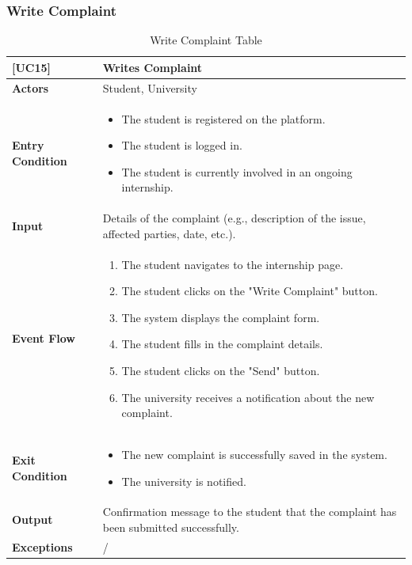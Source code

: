 \subsubsection*{Write Complaint}
\begin{table}[H]
    \centering
    \renewcommand{\arraystretch}{1.5}
    \begin{tabular}{|p{4cm}|p{11cm}|}
    \hline
    \rowcolor{bluepoli!40}
    \textbf{[UC15]} & \textbf{Writes Complaint} \\ \hline \hline
    \textbf{Actors} & Student, University \\ \hline
    \textbf{Entry Condition} & 
    {\setlength{\leftmargini}{1.1em}
    \begin{itemize}
        \item The student is registered on the platform.
        \item The student is logged in.
        \item The student is currently involved in an ongoing internship.
    \end{itemize}} \\ \hline
    \textbf{Input} & Details of the complaint (e.g., description of the issue, affected parties, date, etc.). \\ \hline
    \textbf{Event Flow} & 
    {\setlength{\leftmargini}{1.4em}
    \begin{enumerate}
        \item The student navigates to the internship page.
        \item The student clicks on the "Write Complaint" button.
        \item The system displays the complaint form.
        \item The student fills in the complaint details.
        \item The student clicks on the "Send" button.
        \item The university receives a notification about the new complaint.
    \end{enumerate}} \\ \hline
    \textbf{Exit Condition} & 
    {\setlength{\leftmargini}{1.1em}
    \begin{itemize}
        \item The new complaint is successfully saved in the system.
        \item The university is notified.
    \end{itemize}} \\ \hline
    \textbf{Output} & Confirmation message to the student that the complaint has been submitted successfully. \\ \hline
    \textbf{Exceptions} & / \\ \hline
    \end{tabular}
    \caption{Write Complaint Table}
\end{table}

